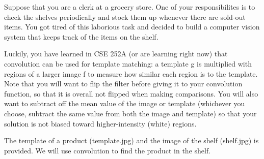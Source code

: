 \documentclass[11pt]{article}
\begin{document}
    Suppose that you are a clerk at a grocery store. One of your
responsibilites is to check the shelves periodically and stock them up
whenever there are sold-out items. You got tired of this laborious task
and decided to build a computer vision system that keeps track of the
items on the shelf.

Luckily, you have learned in CSE 252A (or are learning right now) that
convolution can be used for template matching: a template g is
multiplied with regions of a larger image f to measure how similar each
region is to the template. Note that you will want to flip the filter
before giving it to your convolution function, so that it is overall not
flipped when making comparisons. You will also want to subtract off the
mean value of the image or template (whichever you choose, subtract the
same value from both the image and template) so that your solution is
not biased toward higher-intensity (white) regions.

The template of a product (template.jpg) and the image of the shelf
(shelf.jpg) is provided. We will use convolution to find the product in
the shelf.

 
\end{document}
